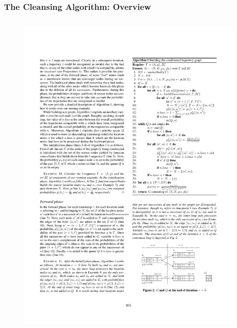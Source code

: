 
\begin{frame}
\frametitle{The Cleansing Algorithm: Overview}

\begin{columns}

  \begin{figure}[tb]
    \includegraphics[width=\columnwidth]{figures/3-4/3-4-3.pdf}
  \end{figure}


\end{columns}
\end{frame}
